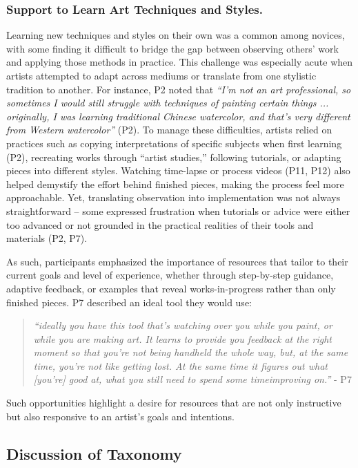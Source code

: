 \subsubsection{Support to Learn Art Techniques and Styles.}
\label{support}

Learning new techniques and styles on their own was a common among novices, with some finding it difficult to bridge the gap between observing others’ work and applying those methods in practice. This challenge was especially acute when artists attempted to adapt across mediums or translate from one stylistic tradition to another. For instance, P2 noted that \textit{``I'm not an art professional, so sometimes I would still struggle with techniques of painting certain things ... originally, I was learning traditional Chinese watercolor, and that's very different from Western watercolor''} (P2). To manage these difficulties, artists relied on practices such as copying interpretations of specific subjects when first learning (P2), recreating works through ``artist studies,'' following tutorials, or adapting pieces into different styles. Watching time-lapse or process videos (P11, P12) also helped demystify the effort behind finished pieces, making the process feel more approachable. Yet, translating observation into implementation was not always straightforward -- some expressed frustration when tutorials or advice were either too advanced or not grounded in the practical realities of their tools and materials (P2, P7). 

As such, participants emphasized the importance of resources that tailor to their current goals and level of experience, whether through step-by-step guidance, adaptive feedback, or examples that reveal works-in-progress rather than only finished pieces.
P7 described an ideal tool they would use:
\begin{quote}
    \textit{``ideally you have this tool that's watching over you while you paint, or while you are making art. It learns to provide you feedback at the right moment so that you're not being handheld the whole way, but, at the same time, you're not like getting lost. At the same time it figures out what [you're] good at, what you still need to spend some timeimproving on.''} - P7
\end{quote}
Such opportunities highlight a desire for resources that are not only instructive but also responsive to an artist’s goals and intentions.


\subsection{Discussion of Taxonomy}
